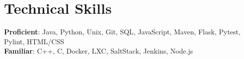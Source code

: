 \documentclass[letterpaper,11pt]{article}
\begin{document}
\section{Technical Skills}
 \begin{itemize}[leftmargin=0.15in, label={}]
    \small{\item{
      \textbf{Proficient}: Java, Python, Unix, Git, SQL, JavaScript, Maven, Flask, Pytest, Pylint, HTML/CSS \\
      \textbf{Familiar}: C++, C, Docker, LXC, SaltStack, Jenkins, Node.js
    }}
 \end{itemize}

\end{document}
